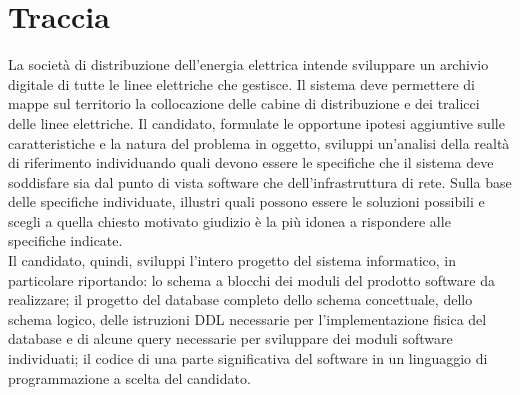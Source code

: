 
\chapter{Traccia} %

\label{Chapter1} %


\newcommand{\keyword}[1]{\textbf{#1}}
\newcommand{\tabhead}[1]{\textbf{#1}}
\newcommand{\code}[1]{\texttt{#1}}
\newcommand{\file}[1]{\texttt{\bfseries#1}}
\newcommand{\option}[1]{\texttt{\itshape#1}}


La società di distribuzione dell'energia elettrica intende sviluppare un archivio digitale di tutte le linee elettriche che gestisce.
Il sistema deve permettere di mappe sul territorio la collocazione delle cabine di distribuzione e dei tralicci delle linee elettriche.
Il candidato, formulate le opportune ipotesi aggiuntive sulle caratteristiche e la natura del problema in oggetto, sviluppi un'analisi della realtà di
riferimento individuando quali devono essere le specifiche che il sistema deve soddisfare sia dal punto di vista software che dell'infrastruttura di rete.
Sulla base delle specifiche individuate, illustri quali possono essere le soluzioni possibili e scegli a quella chiesto motivato giudizio è la più idonea
a rispondere alle specifiche indicate. \\

Il candidato, quindi, sviluppi l'intero progetto del sistema informatico, in particolare riportando:
lo schema a blocchi dei moduli del prodotto software da realizzare;
il progetto del database completo dello schema concettuale, dello schema logico, delle istruzioni DDL necessarie
per l'implementazione fisica del database e di alcune query necessarie per sviluppare dei moduli software individuati;
il codice di una parte significativa del software in un linguaggio di programmazione a scelta del candidato.